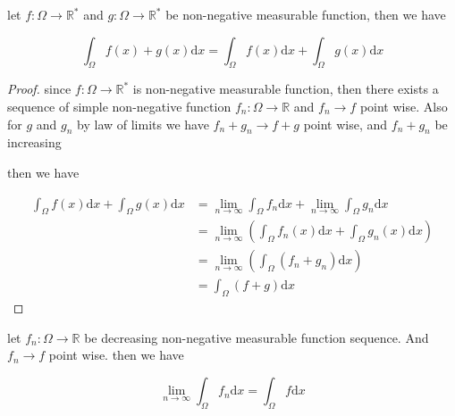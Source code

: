 \documentclass[11pt,a4paper]{article}
\begin{document}
\begin{exercise}
    let $f: \Omega \to \mathbb{R}^*$ and $g: \Omega \to \mathbb{R}^*$ be non-negative measurable function, then we have

    \[
        \int_{\Omega}f(x) + g(x) \mathrm{d}x = \int_{\Omega}f(x) \mathrm{d}x + \int_{\Omega} g(x) \mathrm{d}x
    \]
\end{exercise}

\begin{proof}
    since $f: \Omega \to \mathbb{R}^*$ is non-negative measurable function, then there exists a sequence of 
    simple non-negative function $f_n: \Omega \to \mathbb{R}$ and $f_n \to f$ point wise. Also for $g$ and $g_n$
    by law of limits we have $f_n + g_n \to f + g$ point wise, and $f_n + g_n$ be increasing

    then we have

    \begin{align*}
        \int_{\Omega}f(x) \mathrm{d}x + \int_{\Omega} g(x) \mathrm{d}x &= \lim_{n \to \infty}\int_{\Omega}f_n \mathrm{d}x + \lim_{n \to \infty}\int_{\Omega}g_n \mathrm{d}x \\
        &= \lim_{n \to \infty}\left( \int_{\Omega}f_n(x) \mathrm{d}x + \int_{\Omega}g_n(x) \mathrm{d}x\right) \\
        &= \lim_{n \to \infty}\left( \int_{\Omega} \left( f_n+g_n \right) \mathrm{d}x \right) \\
        &= \int_{\Omega} \left( f + g \right) \mathrm{d}x
    \end{align*}
\end{proof}

\begin{exercise}
    let $f_n: \Omega \to \mathbb{R}$ be decreasing non-negative measurable function sequence. And $f_n \to f$ point wise.
    then we have

    \[
        \lim_{n \to \infty}\int_{\Omega}f_n \mathrm{d}x = \int_{\Omega}f \mathrm{d}x
    \]

\end{exercise}
\end{document}
